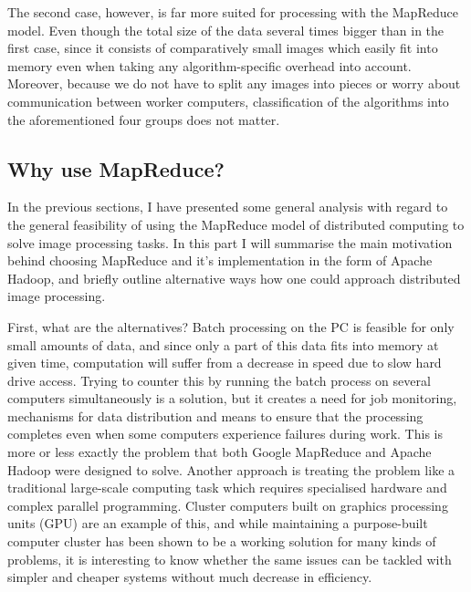 \documentclass [12pt,a4paper]{report}
\begin{document}
The second case, however, is far more suited for processing with the MapReduce model. Even though the total size of the data several times bigger than in the first case, since it consists of comparatively small images which easily fit into memory even when taking any algorithm-specific overhead into account. Moreover, because we do not have to split any images into pieces or worry about communication between worker computers, classification of the algorithms into the aforementioned four groups does not matter.


\subsection{Why use MapReduce?}

In the previous sections, I have presented some general analysis with regard to the general feasibility of using the MapReduce model of distributed computing to solve image processing tasks. In this part I will summarise the main motivation behind choosing MapReduce and it's implementation in the form of Apache Hadoop, and briefly outline alternative ways how one could approach distributed image processing.

First, what are the alternatives? Batch processing on the PC is feasible for only small amounts of data, and since only a part of this data fits into memory at given time, computation will suffer from a decrease in speed due to slow hard drive access. Trying to counter this by running the batch process on several computers simultaneously is a solution, but it creates a need for job monitoring, mechanisms for data distribution and means to ensure that the processing completes even when some computers experience failures during work. This is more or less exactly the problem that both Google MapReduce and Apache Hadoop were designed to solve. Another approach is treating the problem like a traditional large-scale computing task which requires specialised hardware and complex parallel programming. Cluster computers built on graphics processing units (GPU) are an example of this, and while maintaining a purpose-built computer cluster has been shown to be a working solution for many kinds of problems, it is interesting to know whether the same issues can be tackled with simpler and cheaper systems without much decrease in efficiency.
\end{document}
